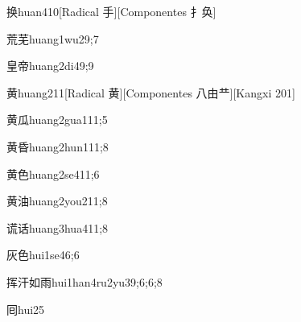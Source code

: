 \begin{verbete}{换}{huan4}{10}[Radical 手][Componentes 扌奂]
\end{verbete}

\begin{verbete}{荒芜}{huang1wu2}{9;7}
\end{verbete}

\begin{verbete}{皇帝}{huang2di4}{9;9}
\end{verbete}

\begin{verbete}{黄}{huang2}{11}[Radical ⻩][Componentes 八由龷][Kangxi 201]
\end{verbete}

\begin{verbete}{黄瓜}{huang2gua1}{11;5}
\end{verbete}

\begin{verbete}{黄昏}{huang2hun1}{11;8}
\end{verbete}

\begin{verbete}{黄色}{huang2se4}{11;6}
\end{verbete}

\begin{verbete}{黄油}{huang2you2}{11;8}
\end{verbete}

\begin{verbete}{谎话}{huang3hua4}{11;8}
\end{verbete}

\begin{verbete}{灰色}{hui1se4}{6;6}
\end{verbete}

\begin{verbete}{挥汗如雨}{hui1han4ru2yu3}{9;6;6;8}
\end{verbete}

\begin{verbete}{囘}{hui2}{5}
\end{verbete}

